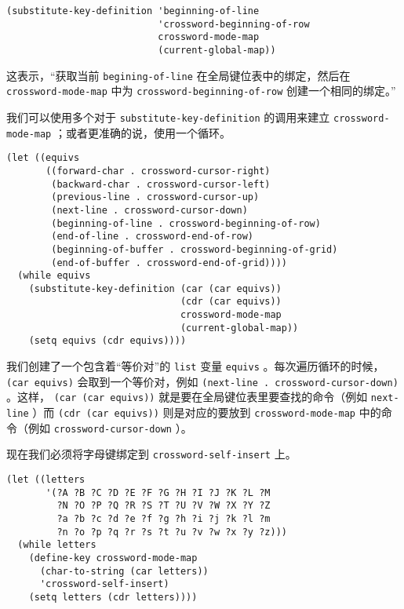 \begin{verbatim}
(substitute-key-definition 'beginning-of-line
                           'crossword-beginning-of-row
                           crossword-mode-map
                           (current-global-map))
\end{verbatim}

这表示，“获取当前 \texttt{begining-of-line} 在全局键位表中的绑定，然后在 \texttt{crossword-mode-map} 中为 \texttt{crossword-beginning-of-row} 创建一个相同的绑定。”

我们可以使用多个对于 \texttt{substitute-key-definition} 的调用来建立 \texttt{crossword-mode-map} ；或者更准确的说，使用一个循环。

\begin{verbatim}
(let ((equivs
       ((forward-char . crossword-cursor-right)
        (backward-char . crossword-cursor-left)
        (previous-line . crossword-cursor-up)
        (next-line . crossword-cursor-down)
        (beginning-of-line . crossword-beginning-of-row)
        (end-of-line . crossword-end-of-row)
        (beginning-of-buffer . crossword-beginning-of-grid)
        (end-of-buffer . crossword-end-of-grid))))
  (while equivs
    (substitute-key-definition (car (car equivs))
                               (cdr (car equivs))
                               crossword-mode-map
                               (current-global-map))
    (setq equivs (cdr equivs))))
\end{verbatim}

我们创建了一个包含着“等价对”的 \texttt{list} 变量 \texttt{equivs} 。每次遍历循环的时候， \texttt{(car equivs)} 会取到一个等价对，例如 \texttt{(next-line . crossword-cursor-down)} 。这样， \texttt{(car (car equivs))} 就是要在全局键位表里要查找的命令（例如 \texttt{next-line} ）而 \texttt{(cdr (car equivs))} 则是对应的要放到 \texttt{crossword-mode-map} 中的命令（例如 \texttt{crossword-cursor-down} ）。

现在我们必须将字母键绑定到 \texttt{crossword-self-insert} 上。

\begin{verbatim}
(let ((letters
       '(?A ?B ?C ?D ?E ?F ?G ?H ?I ?J ?K ?L ?M
         ?N ?O ?P ?Q ?R ?S ?T ?U ?V ?W ?X ?Y ?Z
         ?a ?b ?c ?d ?e ?f ?g ?h ?i ?j ?k ?l ?m
         ?n ?o ?p ?q ?r ?s ?t ?u ?v ?w ?x ?y ?z)))
  (while letters
    (define-key crossword-mode-map
      (char-to-string (car letters))
      'crossword-self-insert)
    (setq letters (cdr letters))))
\end{verbatim}


